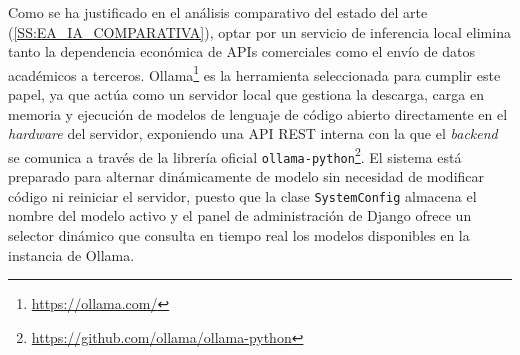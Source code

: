 Como se ha justificado en el análisis comparativo del estado del arte (\autoref{SS:EA_IA_COMPARATIVA}), optar por un servicio de inferencia local elimina tanto la dependencia económica de APIs comerciales como el envío de datos académicos a terceros. Ollama\footnote{\url{https://ollama.com/}} es la herramienta seleccionada para cumplir este papel, ya que actúa como un servidor local que gestiona la descarga, carga en memoria y ejecución de modelos de lenguaje de código abierto directamente en el \textit{hardware} del servidor, exponiendo una API REST interna con la que el \textit{backend} se comunica a través de la librería oficial \texttt{ollama-python}\footnote{\url{https://github.com/ollama/ollama-python}}. El sistema está preparado para alternar dinámicamente de modelo sin necesidad de modificar código ni reiniciar el servidor, puesto que la clase \texttt{SystemConfig} almacena el nombre del modelo activo y el panel de administración de Django ofrece un selector dinámico que consulta en tiempo real los modelos disponibles en la instancia de Ollama.
